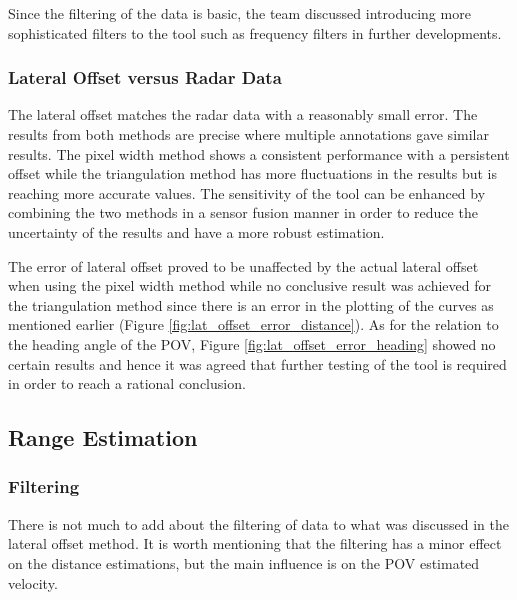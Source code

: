 Since the filtering of the data is basic, the team discussed introducing more sophisticated filters to the tool such as frequency filters in further developments.

\subsubsection{Lateral Offset versus Radar Data}

The lateral offset matches the radar data with a reasonably small error. The results from both methods are precise where multiple annotations gave similar results. The pixel width method shows a consistent performance with a persistent offset while the triangulation method has more fluctuations in the results but is reaching more accurate values. The sensitivity of the tool can be enhanced by combining the two methods in a sensor fusion manner in order to reduce the uncertainty of the results and have a more robust estimation.

The error of lateral offset proved to be unaffected by the actual lateral offset when using the pixel width method while no conclusive result was achieved for the triangulation method since there is an error in the plotting of the curves as mentioned earlier (Figure \ref{fig:lat_offset_error_distance}). As for the relation to the heading angle of the POV, Figure \ref{fig:lat_offset_error_heading} showed no certain results and hence it was agreed that further testing of the tool is required in order to reach a rational conclusion.


\subsection{Range Estimation}
\subsubsection{Filtering}
There is not much to add about the filtering of data to what was discussed in the lateral offset method. It is worth mentioning that the filtering has a minor effect on the distance estimations, but the main influence is on the POV estimated velocity.

